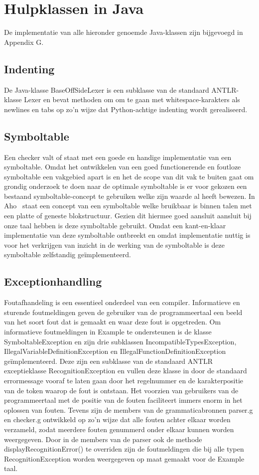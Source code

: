 \chapter{Hulpklassen in Java}
De implementatie van alle hieronder genoemde Java-klassen zijn bijgevoegd in Appendix G.

\section{Indenting}
De Java-klasse BaseOffSideLexer is een subklasse van de standaard ANTLR-klasse Lexer en bevat methoden om om te gaan met whitespace-karakters als newlines en tabs op zo'n wijze dat Python-achtige indenting wordt gerealiseerd.

\section{Symboltable}
Een checker valt of staat met een goede en handige implementatie van een symboltable. Omdat het ontwikkelen van een goed functionerende en foutloze symboltable een vakgebied apart is en het de scope van dit vak te buiten gaat om grondig onderzoek te doen naar de optimale symboltable is er voor gekozen een bestaand symboltable-concept te gebruiken welke zijn waarde al heeft bewezen. In Aho~\cite[p.85-90]{aho2007compilers} staat een concept van een symboltable welke bruikbaar is binnen talen met een platte of geneste blokstructuur. Gezien dit hiermee goed aansluit aansluit bij onze taal hebben is deze symboltable gebruikt. Omdat een kant-en-klaar implementatie van deze symboltable ontbreekt en omdat implementatie nuttig is voor het verkrijgen van inzicht in de werking van de symboltable is deze symboltable zelfstandig ge\"{i}mplementeerd.

\section{Exceptionhandling}
Foutafhandeling is een essentieel onderdeel van een compiler. Informatieve en sturende foutmeldingen geven de gebruiker van de programmeertaal een beeld van het soort fout dat is gemaakt en waar deze fout is opgetreden. Om informatieve foutmeldingen in Example te ondersteunen is de klasse SymboltableException en zijn drie subklassen IncompatibleTypesException, IllegalVariableDefinitionException en IllegalFunctionDefinitionException ge\"{i}mplementeerd. Deze zijn een subklasse van de standaard ANTLR exceptieklasse RecognitionException en vullen deze klasse in door de standaard errormessage vooraf te laten gaan door het regelnummer en de karakterpositie van de token waarop de fout is ontstaan. Het voorzien van gebruikers van de programmeertaal met de positie van de fouten faciliteert immers enorm in het oplossen van fouten. Tevens zijn de members van de grammaticabronnen parser.g en checker.g ontwikkeld op zo'n wijze dat alle fouten achter elkaar worden verzameld, zodat meerdere fouten genummerd onder elkaar kunnen worden weergegeven. Door in de members van de parser ook de methode displayRecognitionError() te overriden zijn de foutmeldingen die bij alle typen RecognitionException worden weergegeven op maat gemaakt voor de Example taal.

